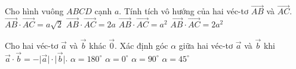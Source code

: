 \begin{ex}%
	Cho hình vuông $ABCD$ cạnh $a$. Tính tích vô hướng của hai véc-tơ $\overrightarrow{AB}$ và $\overrightarrow{AC}$.
	\choice
	{$\overrightarrow{AB}\cdot\overrightarrow{AC}=a\sqrt{2}$}
	{$\overrightarrow{AB}\cdot\overrightarrow{AC}=2a$}
	{\True $\overrightarrow{AB}\cdot\overrightarrow{AC}=a^2$}
	{$\overrightarrow{AB}\cdot\overrightarrow{AC}=2a^2$}
\end{ex}
\begin{ex}%
	Cho hai véc-tơ $\overrightarrow{a} $ và $\overrightarrow{b} $ khác $\overrightarrow{0} $. Xác định góc $\alpha $ giữa hai véc-tơ $\overrightarrow{a} $ và $\overrightarrow{b} $ khi $\overrightarrow{a} \cdot \overrightarrow{b}=-\big| \overrightarrow{a}\big| \cdot \big| \overrightarrow{b}\big| $. 
	\choice
	{\True $\alpha=180^\circ $}
	{$\alpha=0^\circ $}
	{$\alpha=90^\circ $}
	{$\alpha=45^\circ $}
\end{ex}

